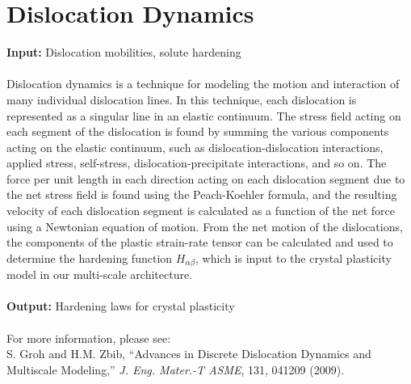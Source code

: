 \documentclass[12pt]{article}
\begin{document}
 \section{Dislocation Dynamics}
 \textbf{Input:}  Dislocation mobilities, solute hardening\\
 \\
Dislocation dynamics is a technique for modeling the motion and interaction of many individual dislocation lines. In this technique, each dislocation is represented as a singular line in an elastic continuum. The stress field acting on each segment of the dislocation is found by summing the various components acting on the elastic continuum, such as dislocation-dislocation interactions, applied stress, self-stress, dislocation-precipitate interactions, and so on. The force per unit length in each direction acting on each dislocation segment due to the net stress field is found using the Peach-Koehler formula, and the resulting velocity of each dislocation segment is calculated as a function of the net force using a Newtonian equation of motion. From the net motion of the dislocations, the components of the plastic strain-rate tensor can be calculated and used to determine the hardening function $H_{\alpha\beta}$, which is input to the crystal plasticity model in our multi-scale architecture.\\
\\
\textbf{Output:} Hardening laws for crystal plasticity \\
\\
For more information, please see:
\\
S. Groh and H.M. Zbib, ``Advances in Discrete Dislocation Dynamics and Multiscale Modeling,'' \textit{J. Eng. Mater.-T ASME}, 131, 041209 (2009).

\end{document}
